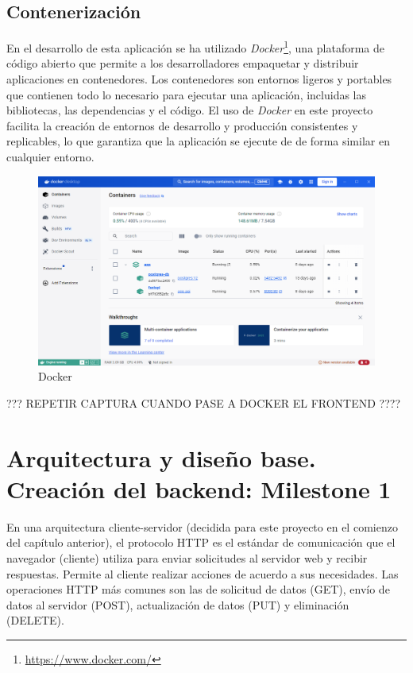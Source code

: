 \subsection{Contenerización}
En el desarrollo de esta aplicación se ha utilizado \textit{Docker}\footnote{\url{https://www.docker.com/}}, una plataforma de código abierto que permite a los desarrolladores empaquetar y distribuir aplicaciones en contenedores. Los contenedores son entornos ligeros y portables que contienen todo lo necesario para ejecutar una aplicación, incluidas las bibliotecas, las dependencias y el código. El uso de \textit{Docker} en este proyecto facilita la creación de entornos de desarrollo y producción consistentes y replicables, lo que garantiza que la aplicación se ejecute de de forma similar en cualquier entorno.
\begin{figure}[ht!]
    \centering
    \includegraphics[width=\linewidth]{imagenes/docker.png}
    \caption{Docker}
    \label{fig:docker}
\end{figure}

??? REPETIR CAPTURA CUANDO PASE A DOCKER EL FRONTEND ????


\section{Arquitectura y diseño base. Creación del backend: Milestone 1}
En una arquitectura cliente-servidor (decidida para este proyecto en el comienzo del capítulo anterior), el protocolo HTTP es el estándar de comunicación que el navegador (cliente) utiliza para enviar solicitudes al servidor web y recibir respuestas. Permite al cliente realizar acciones de acuerdo a sus necesidades. Las operaciones HTTP más comunes son las de solicitud de datos (GET), envío de datos al servidor (POST), actualización de datos (PUT) y eliminación (DELETE). 

